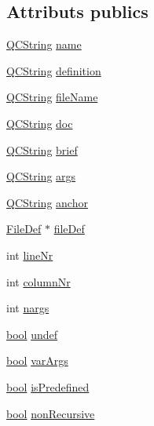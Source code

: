 \subsection*{Attributs publics}
\begin{DoxyCompactItemize}
\item 
\hyperlink{class_q_c_string}{Q\+C\+String} \hyperlink{class_define_a2ab61e312bcf057292789daa0de8bf78}{name}
\item 
\hyperlink{class_q_c_string}{Q\+C\+String} \hyperlink{class_define_ac76e113d9f4c5b64553022777f686093}{definition}
\item 
\hyperlink{class_q_c_string}{Q\+C\+String} \hyperlink{class_define_a2403c7fc667a4a5fd74c8a78560030cc}{file\+Name}
\item 
\hyperlink{class_q_c_string}{Q\+C\+String} \hyperlink{class_define_a1b3bef5b8c601c4e4c94bf0d1d102a9f}{doc}
\item 
\hyperlink{class_q_c_string}{Q\+C\+String} \hyperlink{class_define_a848ac050e42cc2f52f505ac151e48bd8}{brief}
\item 
\hyperlink{class_q_c_string}{Q\+C\+String} \hyperlink{class_define_a1ab8e5663a0acb5c7634087fb32c67b8}{args}
\item 
\hyperlink{class_q_c_string}{Q\+C\+String} \hyperlink{class_define_aee858a544823d6180c3bda8b3736c4da}{anchor}
\item 
\hyperlink{class_file_def}{File\+Def} $\ast$ \hyperlink{class_define_a3f350ee951cde6b1955612af5be6a6d5}{file\+Def}
\item 
int \hyperlink{class_define_a16325de589f92470990e80e0d3cb403f}{line\+Nr}
\item 
int \hyperlink{class_define_aa3baaeb7d662ad6190da946f3a65a773}{column\+Nr}
\item 
int \hyperlink{class_define_ad3306a44c59125a65fbf9559abe97930}{nargs}
\item 
\hyperlink{qglobal_8h_a1062901a7428fdd9c7f180f5e01ea056}{bool} \hyperlink{class_define_afde97e0a7fadda62d088b18acc7a5a0e}{undef}
\item 
\hyperlink{qglobal_8h_a1062901a7428fdd9c7f180f5e01ea056}{bool} \hyperlink{class_define_a1802523098fdd274fd15cd0494ad26d1}{var\+Args}
\item 
\hyperlink{qglobal_8h_a1062901a7428fdd9c7f180f5e01ea056}{bool} \hyperlink{class_define_a856ae02f323f7e3f95fee4101da3904b}{is\+Predefined}
\item 
\hyperlink{qglobal_8h_a1062901a7428fdd9c7f180f5e01ea056}{bool} \hyperlink{class_define_a673dcd69701965f0f62c73ce14dc6665}{non\+Recursive}
\end{DoxyCompactItemize}


